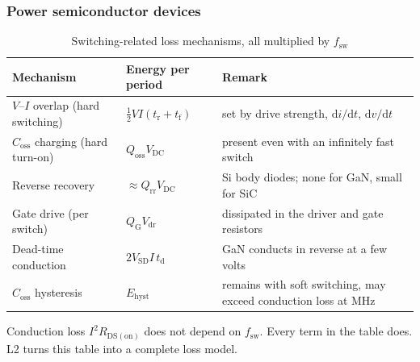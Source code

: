 \begin{frame}
	\frametitle{Power semiconductor devices}
	\begin{table}
		\centering
		\small
		\begin{tabular}{|l|l|>{\raggedright\arraybackslash}p{6.2cm}|}
			\hline
			\textbf{Mechanism}                    & \textbf{Energy per period}                  & \textbf{Remark}                                                     \\
			\hline
			$V$--$I$ overlap (hard switching)     & $\frac12 VI(t_\mathrm{r}+t_\mathrm{f})$      & set by drive strength, $\mathrm{d}i/\mathrm{d}t$, $\mathrm{d}v/\mathrm{d}t$ \\
			$C_\mathrm{oss}$ charging (hard turn-on) & $Q_\mathrm{oss}V_\mathrm{DC}$            & present even with an infinitely fast switch                         \\
			Reverse recovery                      & $\approx Q_\mathrm{rr}V_\mathrm{DC}$          & Si body diodes; none for GaN, small for SiC                         \\
			Gate drive (per switch)               & $Q_\mathrm{G}V_\mathrm{dr}$                  & dissipated in the driver and gate resistors                         \\
			Dead-time conduction                  & $2V_\mathrm{SD}I\,t_\mathrm{d}$              & GaN conducts in reverse at a few volts                              \\
			$C_\mathrm{oss}$ hysteresis           & $E_\mathrm{hyst}$                            & remains with soft switching, may exceed conduction loss at MHz      \\
			\hline
		\end{tabular}
		\caption{Switching-related loss mechanisms, all multiplied by $f_\mathrm{sw}$}
	\end{table}
	Conduction loss $I^2R_\mathrm{DS(on)}$ does not depend on $f_\mathrm{sw}$. Every term in the table does. L2 turns this table into a complete loss model.
\end{frame}

